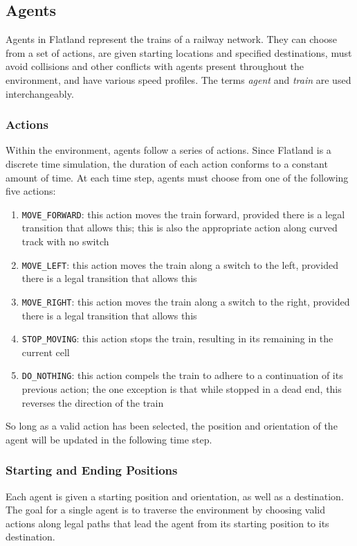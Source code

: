\documentclass[11pt]{article}
\newcommand{\code}[1]{\colorbox{light-gray}{\texttt{#1}}}
\begin{document}
\subsection{Agents}
\label{sec:Agents}
Agents in Flatland represent the trains of a railway network.  They can choose from a set of actions, are given starting locations and specified destinations, must avoid collisions and other conflicts with agents present throughout the environment, and have various speed profiles.  The terms \textit{agent} and \textit{train} are used interchangeably.

\subsubsection{Actions}
\label{sec:Actions}
Within the environment, agents follow a series of actions.  Since Flatland is a discrete time simulation, the duration of each action conforms to a constant amount of time.    At each time step, agents must choose from one of the following five actions: 
\begin{enumerate}
  \item \code{MOVE\_FORWARD}: this action moves the train forward, provided there is a legal transition that allows this; this is also the appropriate action along curved track with no switch
  \item \code{MOVE\_LEFT}: this action moves the train along a switch to the left, provided there is a legal transition that allows this
  \item \code{MOVE\_RIGHT}: this action moves the train along a switch to the right, provided there is a legal transition that allows this
  \item \code{STOP\_MOVING}: this action stops the train, resulting in its remaining in the current cell
  \item\code{{DO\_NOTHING}}: this action compels the train to adhere to a continuation of its previous action; the one exception is that while stopped in a dead end, this reverses the direction of the train
\end{enumerate} \smallskip

\noindent So long as a valid action has been selected, the position and orientation of the agent will be updated in the following time step. \medskip

\subsubsection{Starting and Ending Positions}
\label{sec:Positions}
Each agent is given a starting position and orientation, as well as a destination.  The goal for a single agent is to traverse the environment by choosing valid actions along legal paths that lead the agent from its starting position to its destination.  
\end{document}
